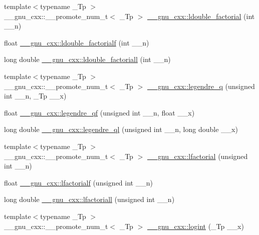 \begin{DoxyCompactItemize}
\item 
{\footnotesize template$<$typename \+\_\+\+Tp $>$ }\\\+\_\+\+\_\+gnu\+\_\+cxx\+::\+\_\+\+\_\+promote\+\_\+num\+\_\+t$<$ \+\_\+\+Tp $>$ \hyperlink{group__gnu__math__spec__func_gac97a4a380940765948e0663fbc119544}{\+\_\+\+\_\+gnu\+\_\+cxx\+::ldouble\+\_\+factorial} (int \+\_\+\+\_\+n)
\item 
float \hyperlink{group__gnu__math__spec__func_ga33ecc59a7ff139b483cebf42ecd4fe79}{\+\_\+\+\_\+gnu\+\_\+cxx\+::ldouble\+\_\+factorialf} (int \+\_\+\+\_\+n)
\item 
long double \hyperlink{group__gnu__math__spec__func_gae8fa4b4866cfd20349c985b33ed2936e}{\+\_\+\+\_\+gnu\+\_\+cxx\+::ldouble\+\_\+factoriall} (int \+\_\+\+\_\+n)
\item 
{\footnotesize template$<$typename \+\_\+\+Tp $>$ }\\\+\_\+\+\_\+gnu\+\_\+cxx\+::\+\_\+\+\_\+promote\+\_\+num\+\_\+t$<$ \+\_\+\+Tp $>$ \hyperlink{group__gnu__math__spec__func_gac0bb3b5a3229e7b7f80982785ff8f477}{\+\_\+\+\_\+gnu\+\_\+cxx\+::legendre\+\_\+q} (unsigned int \+\_\+\+\_\+n, \+\_\+\+Tp \+\_\+\+\_\+x)
\item 
float \hyperlink{group__gnu__math__spec__func_gaedb2871cec8f0f160524205e9083621d}{\+\_\+\+\_\+gnu\+\_\+cxx\+::legendre\+\_\+qf} (unsigned int \+\_\+\+\_\+n, float \+\_\+\+\_\+x)
\item 
long double \hyperlink{group__gnu__math__spec__func_ga35de372a666b6d530d4b3704ff4a878b}{\+\_\+\+\_\+gnu\+\_\+cxx\+::legendre\+\_\+ql} (unsigned int \+\_\+\+\_\+n, long double \+\_\+\+\_\+x)
\item 
{\footnotesize template$<$typename \+\_\+\+Tp $>$ }\\\+\_\+\+\_\+gnu\+\_\+cxx\+::\+\_\+\+\_\+promote\+\_\+num\+\_\+t$<$ \+\_\+\+Tp $>$ \hyperlink{group__gnu__math__spec__func_ga17b1dc664e1ab95213c340f2453b09e3}{\+\_\+\+\_\+gnu\+\_\+cxx\+::lfactorial} (unsigned int \+\_\+\+\_\+n)
\item 
float \hyperlink{group__gnu__math__spec__func_ga65af05c4093d4895a564a8d67e389a9b}{\+\_\+\+\_\+gnu\+\_\+cxx\+::lfactorialf} (unsigned int \+\_\+\+\_\+n)
\item 
long double \hyperlink{group__gnu__math__spec__func_ga3a0c196f34916dc68c29c89f26cbe1ee}{\+\_\+\+\_\+gnu\+\_\+cxx\+::lfactoriall} (unsigned int \+\_\+\+\_\+n)
\item 
{\footnotesize template$<$typename \+\_\+\+Tp $>$ }\\\+\_\+\+\_\+gnu\+\_\+cxx\+::\+\_\+\+\_\+promote\+\_\+num\+\_\+t$<$ \+\_\+\+Tp $>$ \hyperlink{group__gnu__math__spec__func_ga5c80d417c0fbd41cc9ef0d6f663f9a66}{\+\_\+\+\_\+gnu\+\_\+cxx\+::logint} (\+\_\+\+Tp \+\_\+\+\_\+x)

\end{DoxyCompactItemize}
